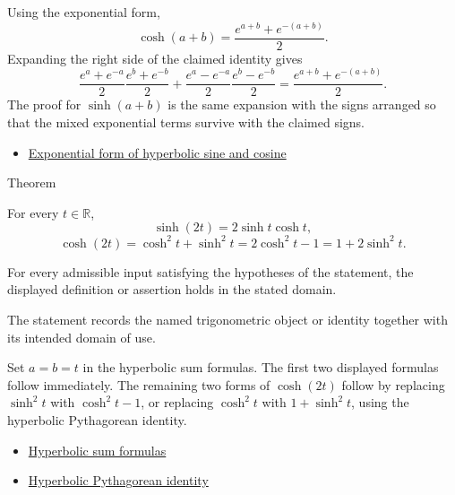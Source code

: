 \begin{remark*}[Proof]
Using the exponential form,
\[
  \cosh(a+b)
  =\frac{e^{a+b}+e^{-(a+b)}}{2}.
\]
Expanding the right side of the claimed identity gives
\[
\frac{e^a+e^{-a}}{2}\frac{e^b+e^{-b}}{2}
+\frac{e^a-e^{-a}}{2}\frac{e^b-e^{-b}}{2}
=\frac{e^{a+b}+e^{-(a+b)}}{2}.
\]
The proof for $\sinh(a+b)$ is the same expansion with the signs arranged so
that the mixed exponential terms survive with the claimed signs.
\end{remark*}
\begin{dependencies}
\begin{itemize}
  \item \hyperref[thm:hyperbolic-exponential-form]{Exponential form of hyperbolic sine and cosine}
\end{itemize}
\end{dependencies}

\begin{theorembox}{Theorem}
\begin{theorem}
\label{thm:hyperbolic-double-angle-formulas}
For every $t\in\mathbb{R}$,
\[
  \sinh(2t)=2\sinh t\cosh t,
\]
\[
  \cosh(2t)=\cosh^2 t+\sinh^2 t
  =2\cosh^2 t-1
  =1+2\sinh^2 t.
\]
\end{theorem}
\end{theorembox}
\begin{remark*}
For every admissible input satisfying the hypotheses of the statement, the
displayed definition or assertion holds in the stated domain.
\end{remark*}

\begin{remark*}[Interpretation]
The statement records the named trigonometric object or identity together with
its intended domain of use.
\end{remark*}

\begin{remark*}[Proof]
Set $a=b=t$ in the hyperbolic sum formulas. The first two displayed formulas
follow immediately. The remaining two forms of $\cosh(2t)$ follow by replacing
$\sinh^2 t$ with $\cosh^2 t-1$, or replacing $\cosh^2 t$ with
$1+\sinh^2 t$, using the hyperbolic Pythagorean identity.
\end{remark*}
\begin{dependencies}
\begin{itemize}
  \item \hyperref[thm:hyperbolic-sum-formulas]{Hyperbolic sum formulas}
  \item \hyperref[thm:hyperbolic-pythagorean-identity]{Hyperbolic Pythagorean identity}
\end{itemize}
\end{dependencies}


